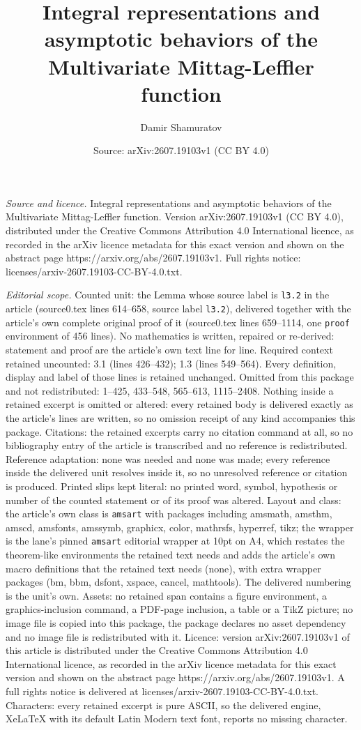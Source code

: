 \documentclass[10pt,a4paper]{amsart}
\title[Integral representations and asymptotic behaviors of the Mul]{Integral representations and asymptotic behaviors of the Multivariate Mittag-Leffler function}
\author{Damir Shamuratov}
\date{Source: arXiv:2607.19103v1 (CC BY 4.0)}
\begin{document}
\maketitle

\noindent\emph{Source and licence.} Integral representations and asymptotic behaviors of the Multivariate Mittag-Leffler function. Version arXiv:2607.19103v1 (CC BY 4.0), distributed under the Creative Commons Attribution 4.0 International licence, as recorded in the arXiv licence metadata for this exact version and shown on the abstract page https://arxiv.org/abs/2607.19103v1. Full rights notice: licenses/arxiv-2607.19103-CC-BY-4.0.txt.\par\smallskip

\noindent\textit{Editorial scope.} Counted unit: the Lemma whose source label is \texttt{l3.2} in the article (source0.tex lines 614--658, source label \texttt{l3.2}), delivered together with the article's own complete original proof of it (source0.tex lines 659--1114, one \texttt{proof} environment of 456 lines). No mathematics is written, repaired or re-derived: statement and proof are the article's own text line for line. Required context retained uncounted: 3.1 (lines 426--432); 1.3 (lines 549--564). Every definition, display and label of those lines is retained unchanged. Omitted from this package and not redistributed: 1--425, 433--548, 565--613, 1115--2408. Nothing inside a retained excerpt is omitted or altered: every retained body is delivered exactly as the article's lines are written, so no omission receipt of any kind accompanies this package. Citations: the retained excerpts carry no citation command at all, so no bibliography entry of the article is transcribed and no reference is redistributed. Reference adaptation: none was needed and none was made; every reference inside the delivered unit resolves inside it, so no unresolved reference or citation is produced. Printed slips kept literal: no printed word, symbol, hypothesis or number of the counted statement or of its proof was altered. Layout and class: the article's own class is \texttt{amsart} with packages including amsmath, amsthm, amscd, amsfonts, amssymb, graphicx, color, mathrsfs, hyperref, tikz; the wrapper is the lane's pinned \texttt{amsart} editorial wrapper at 10pt on A4, which restates the theorem-like environments the retained text needs and adds the article's own macro definitions that the retained text needs (none), with extra wrapper packages (bm, bbm, dsfont, xspace, cancel, mathtools). The delivered numbering is the unit's own. Assets: no retained span contains a figure environment, a graphics-inclusion command, a PDF-page inclusion, a table or a TikZ picture; no image file is copied into this package, the package declares no asset dependency and no image file is redistributed with it. Licence: version arXiv:2607.19103v1 of this article is distributed under the Creative Commons Attribution 4.0 International licence, as recorded in the arXiv licence metadata for this exact version and shown on the abstract page https://arxiv.org/abs/2607.19103v1. A full rights notice is delivered at licenses/arxiv-2607.19103-CC-BY-4.0.txt. Characters: every retained excerpt is pure ASCII, so the delivered engine, XeLaTeX with its default Latin Modern text font, reports no missing character.
\end{document}
